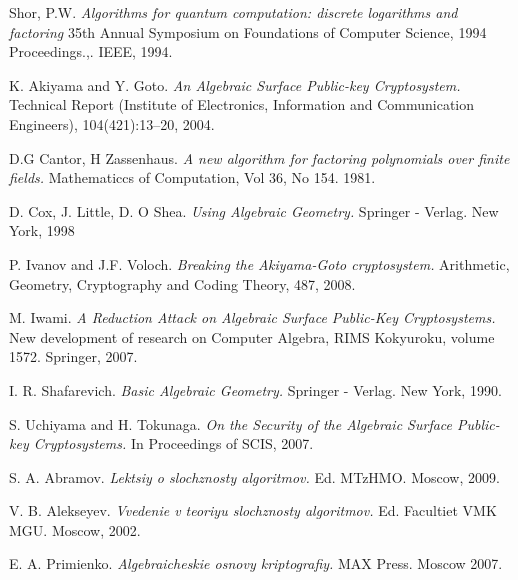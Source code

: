 \documentclass[12pt]{article}
\begin{document}
\begin{footnotesize}





\begin{thebibliography}{999999}

 {\sc Shor, P.W. } {\sl Algorithms for quantum computation: discrete logarithms and factoring } 35th Annual Symposium on Foundations of Computer Science, 1994 Proceedings.,. IEEE, 1994.

 {\sc K. Akiyama and Y. Goto.} {\sl An Algebraic Surface Public-key Cryptosystem.} Technical Report (Institute of Electronics, Information and Communication Engineers), 104(421):13–20, 2004.


 {\sc D.G Cantor, H Zassenhaus.} {\sl A new algorithm for factoring polynomials over finite fields. } Mathematiccs of Computation, Vol 36, No 154.  1981.

 {\sc D. Cox, J. Little, D. O Shea.} {\sl Using Algebraic Geometry. } Springer - Verlag. New York, 1998

 {\sc P. Ivanov and J.F. Voloch.} {\sl Breaking the Akiyama-Goto cryptosystem.}  Arithmetic, Geometry, Cryptography and Coding Theory, 487, 2008.

 {\sc M. Iwami.} {\sl A Reduction Attack on Algebraic Surface Public-Key Cryptosystems. } New development of research on Computer Algebra, RIMS Kokyuroku, volume 1572. Springer, 2007.

 {\sc I. R. Shafarevich. } \textsl{Basic Algebraic Geometry. } Springer - Verlag. New York, 1990.

 {\sc S. Uchiyama and H. Tokunaga. } \textsl{ On the Security of the Algebraic Surface Public-key Cryptosystems. } In Proceedings of SCIS, 2007.


 {\sc S. A. Abramov. } \textsl{Lektsiy o slochznosty algoritmov. }  Ed. MTzHMO. Moscow, 2009.

 {\sc V. B. Alekseyev.} {\sl Vvedenie v teoriyu slochznosty algoritmov. } Ed. Facultiet VMK MGU. Moscow, 2002.

 {\sc E. A. Primienko. } \textsl{ Algebraicheskie osnovy kriptografiy. } MAX Press. Moscow  2007.
\end{thebibliography}
\end{footnotesize}
\end{document}
